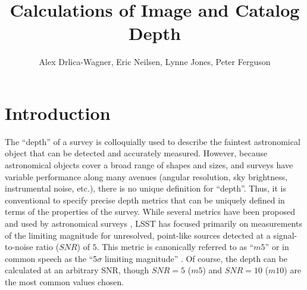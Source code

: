 \documentclass[DM,authoryear,toc]{lsstdoc}
\title{Calculations of Image and Catalog Depth}
\author{%
Alex Drlica-Wagner,
Eric Neilsen,
Lynne Jones,
Peter Ferguson
}
\date{\vcsDate}
\begin{document}
\maketitle


\section{Introduction}

The ``depth'' of a survey is colloquially used to describe the faintest astronomical object that can be detected and accurately measured. However, because astronomical objects cover a broad range of shapes and sizes, and surveys have variable performance along many avenues (angular resolution, sky brightness, instrumental noise, etc.), there is no unique definition for ``depth''. Thus, it is conventional to specify precise depth metrics that can be uniquely defined in terms of the properties of the survey. While several metrics have been proposed and used by astronomical surveys \citep[e.g.,][]{Rykoff:2015, DES-DR2}, LSST has focused primarily on measurements of the limiting magnitude for unresolved, point-like sources detected at a signal-to-noise ratio ($SNR$) of $5$. This metric is canonically referred to as  ``$m5$'' or in common speech as the ``5$\sigma$ limiting magnitude'' \citep[e.g.,][]{SMTN-002}. Of course, the depth can be calculated at an arbitrary SNR, though ${SNR} = 5$ ($m5$) and ${SNR} = 10$ ($m10$) are the most common values chosen.
\end{document}
